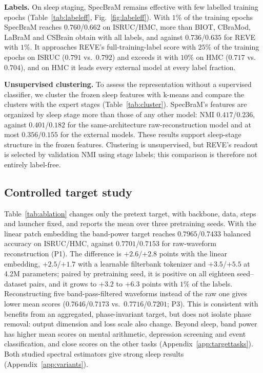 \noindent\textbf{Labels.} On sleep staging, SpecBraM remains effective with few labelled
training epochs (Table~\ref{tab:labeleff}, Fig.~\ref{fig:labeleff}). With $1\%$ of the training epochs SpecBraM
reaches $0.760$/$0.662$ on ISRUC/HMC, more than BIOT, CBraMod, LaBraM and CSBrain obtain with all
labels, and against $0.736$/$0.635$ for REVE with $1\%$. It approaches REVE's full-training-label score
with $25\%$ of the training epochs on ISRUC ($0.791$ vs.\ $0.792$) and exceeds it with $10\%$ on HMC
($0.717$ vs.\ $0.704$), and on HMC it leads every external model at every label fraction.

\noindent\textbf{Unsupervised clustering.} To assess the representation without a supervised classifier,
we cluster the frozen sleep features with k-means and compare the clusters with the expert
stages (Table~\ref{tab:cluster}). SpecBraM's features are organized by sleep stage more than
those of any other model: NMI $0.417$/$0.236$, against $0.401$/$0.182$ for the same-architecture
raw-reconstruction model and at most $0.356$/$0.155$ for the external models. These results
support sleep-stage structure in the frozen features. Clustering is unsupervised, but REVE's
readout is selected by validation NMI using stage labels; this comparison is therefore not
entirely label-free.



\subsection{Controlled target study}\label{sec:targetstudy}
Table~\ref{tab:ablation} changes only the pretext target, with backbone, data, steps and
launcher fixed, and reports the mean over three pretraining seeds. With the linear patch
embedding the band-power target reaches $0.7965$/$0.7433$ balanced accuracy on ISRUC/HMC, against
$0.7701$/$0.7153$ for raw-waveform reconstruction (P1). The difference is $+2.6$/$+2.8$ points with the linear embedding,
$+2.5$/$+1.7$ with a learnable filterbank tokenizer and $+3.5$/$+5.5$ at 4.2M parameters;
paired by pretraining seed, it is positive on all eighteen seed--dataset pairs, and it grows to
$+3.2$ to $+6.3$ points with $1\%$ of the labels. Reconstructing five band-pass-filtered
waveforms instead of the raw one gives lower mean scores ($0.7646$/$0.7173$ vs.\ $0.7716$/$0.7201$; P3).
This is consistent with benefits from an aggregated, phase-invariant target, but does not
isolate phase removal: output dimension and loss scale also change. Beyond sleep, band power
has higher mean scores on mental arithmetic, depression screening and event classification,
and close scores on the other tasks (Appendix~\ref{app:targettasks}). Both studied spectral
estimators give strong sleep results (Appendix~\ref{app:variants}).
